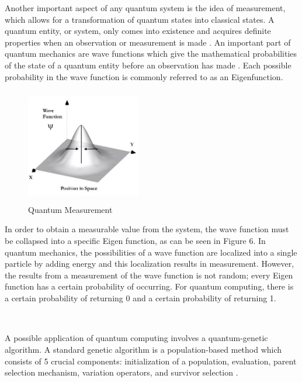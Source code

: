 Another important aspect of any quantum system is the idea of measurement, which allows for a transformation of quantum states into classical states. A quantum entity, or system, only comes into existence and acquires definite properties when an observation or measurement is made \cite{forrester_quantum_nodate}. An important part of quantum mechanics are wave functions which give the mathematical probabilities of the state of a quantum entity before an observation has made \cite{forrester_quantum_nodate}. Each possible probability in the wave function is commonly referred to as an Eigenfunction. 

\begin{figure}[ht]%
\centering
\includegraphics[width=5cm,height=5cm]{Images/eigen-function.jpg}
\caption{Quantum Measurement \cite{noauthor_copenhagen_nodate}}%
\end{figure}

In order to obtain a measurable value from the system, the wave function must be collapsed into a specific Eigen function, as can be seen in Figure 6. In quantum mechanics, the possibilities of a wave function are localized into a single particle by adding energy and this localization results in measurement. However, the results from a measurement of the wave function is not random; every Eigen function has a certain probability of occurring. For quantum computing, there is a certain probability of returning 0 and a certain probability of returning 1.

\subsection*{\color{SubSectionBlue}{Quantum Genetic Algorithms}}
 \\

A possible application of quantum computing involves a quantum-genetic algorithm. A standard genetic algorithm is a population-based method which consists of 5 crucial components: initialization of a population, evaluation, parent selection mechanism, variation operators, and survivor selection \cite{garg_vector_2017}. 

